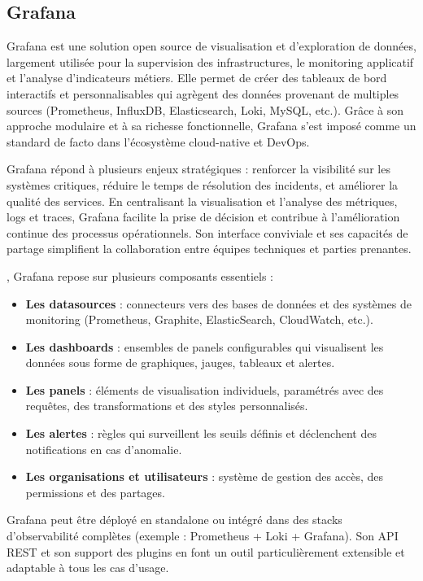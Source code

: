 \subsection{Grafana}

Grafana est une solution open source de visualisation et d’exploration de données, largement utilisée pour la supervision des infrastructures, le monitoring applicatif et l’analyse d’indicateurs métiers. Elle permet de créer des tableaux de bord interactifs et personnalisables qui agrègent des données provenant de multiples sources (Prometheus, InfluxDB, Elasticsearch, Loki, MySQL, etc.). Grâce à son approche modulaire et à sa richesse fonctionnelle, Grafana s’est imposé comme un standard de facto dans l’écosystème cloud-native et DevOps.

 Grafana répond à plusieurs enjeux stratégiques  : renforcer la visibilité sur les systèmes critiques, réduire le temps de résolution des incidents, et améliorer la qualité des services. En centralisant la visualisation et l’analyse des métriques, logs et traces, Grafana facilite la prise de décision et contribue à l’amélioration continue des processus opérationnels. Son interface conviviale et ses capacités de partage simplifient la collaboration entre équipes techniques et parties prenantes.

, Grafana repose sur plusieurs composants essentiels  :
\begin{itemize}
	\item \textbf{Les datasources}  : connecteurs vers des bases de données et des systèmes de monitoring (Prometheus, Graphite, ElasticSearch, CloudWatch, etc.).
	\item \textbf{Les dashboards}  : ensembles de panels configurables qui visualisent les données sous forme de graphiques, jauges, tableaux et alertes.
	\item \textbf{Les panels}  : éléments de visualisation individuels, paramétrés avec des requêtes, des transformations et des styles personnalisés.
	\item \textbf{Les alertes}  : règles qui surveillent les seuils définis et déclenchent des notifications en cas d’anomalie.
	\item \textbf{Les organisations et utilisateurs}  : système de gestion des accès, des permissions et des partages.
\end{itemize}

Grafana peut être déployé en standalone ou intégré dans des stacks d’observabilité complètes (exemple  : Prometheus + Loki + Grafana). Son API REST et son support des plugins en font un outil particulièrement extensible et adaptable à tous les cas d’usage.

